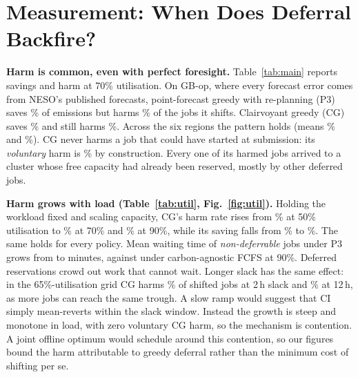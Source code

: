 


\section{Measurement: When Does Deferral Backfire?}\label{sec:measure}

\textbf{Harm is common, even with perfect foresight.}
Table~\ref{tab:main} reports savings and harm at 70\% utilisation. On GB-op, where every forecast
error comes from NESO's published forecasts, point-forecast greedy with re-planning (P3) saves
\% of emissions but harms
\% of the jobs it shifts. Clairvoyant greedy (CG) saves
\% and still harms
\%. Across the six regions the pattern holds
(means \% and
\%). CG never harms a job that could have started
at submission: its \emph{voluntary} harm is \%
by construction. Every one of its harmed jobs arrived to a cluster whose free capacity had already
been reserved, mostly by other deferred jobs.

\textbf{Harm grows with load (Table~\ref{tab:util}, Fig.~\ref{fig:util}).}
Holding the workload fixed and scaling capacity, CG's harm rate rises from
\% at 50\% utilisation to
\% at 70\% and
\% at 90\%, while its saving falls from
\% to \%.
The same holds for every policy. Mean waiting time of \emph{non-deferrable} jobs under P3 grows from
 to
 minutes, against
 under carbon-agnostic FCFS at 90\%.
Deferred reservations crowd out work that cannot wait. Longer slack has the same effect: in the
65\%-utilisation grid CG harms \% of shifted jobs at 2\,h slack
and \% at 12\,h, as more jobs can reach the same trough.
A slow ramp would suggest that CI simply mean-reverts within the slack window. Instead the growth is
steep and monotone in load, with zero voluntary CG harm, so the mechanism is contention.
A joint offline optimum would schedule around this contention, so our figures bound the harm
attributable to greedy deferral rather than the minimum cost of shifting per se.


